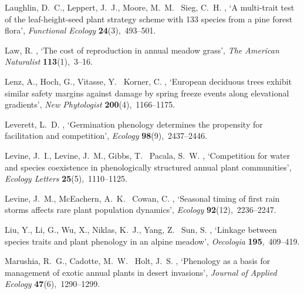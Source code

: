 \documentclass[11pt]{article}
\begin{document}
\begin{thebibliography}{xx}
Laughlin, D.~C., Leppert, J.~J., Moore, M.~M. \harvardand\ Sieg, C.~H.
  \harvardyearleft 2010\harvardyearright , `A multi-trait test of the
  leaf-height-seed plant strategy scheme with 133 species from a pine forest
  flora', {\em Functional Ecology} {\bf 24}(3),~493--501.

Law, R.  \harvardyearright , `The cost of reproduction in
  annual meadow grass', {\em The American Naturalist} {\bf 113}(1),~3--16.

Lenz, A., Hoch, G., Vitasse, Y. \harvardand\ Korner, C.  \harvardyearleft
  2013\harvardyearright , `European deciduous trees exhibit similar safety
  margins against damage by spring freeze events along elevational gradients',
  {\em New Phytologist} {\bf 200}(4),~1166--1175.

Leverett, L.~D.  \harvardyearright , `Germination
  phenology determines the propensity for facilitation and competition', {\em
  Ecology} {\bf 98}(9),~2437--2446.

Levine, J.~I., Levine, J.~M., Gibbs, T. \harvardand\ Pacala, S.~W.
  \harvardyearleft 2022\harvardyearright , `Competition for water and species
  coexistence in phenologically structured annual plant communities', {\em
  Ecology Letters} {\bf 25}(5),~1110--1125.

Levine, J.~M., McEachern, A.~K. \harvardand\ Cowan, C.  \harvardyearright , `Seasonal timing of first rain storms affects rare
  plant population dynamics', {\em Ecology} {\bf 92}(12),~2236--2247.

Liu, Y., Li, G., Wu, X., Niklas, K.~J., Yang, Z. \harvardand\ Sun, S.
  \harvardyearleft 2021\harvardyearright , `Linkage between species traits and
  plant phenology in an alpine meadow', {\em Oecologia} {\bf 195},~409--419.

Marushia, R.~G., Cadotte, M.~W. \harvardand\ Holt, J.~S.  \harvardyearleft
  2010\harvardyearright , `Phenology as a basis for management of exotic annual
  plants in desert invasions', {\em Journal of Applied Ecology} {\bf
  47}(6),~1290--1299.


\end{thebibliography}
\end{document}
